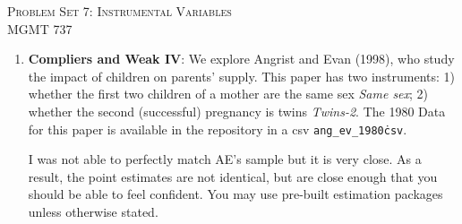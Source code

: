 \documentclass[11pt, a4paper]{article}
\begin{document}
\begin{center}
  {\Large \textsc{Problem Set 7: Instrumental Variables}}\\
  MGMT 737
\end{center}

\begin{enumerate}
\item \textbf{Compliers and Weak IV}: We explore Angrist and Evan (1998), who
  study the impact of children on parents' supply. This paper has two
  instruments: 1) whether the first two children of a mother are the
  same sex \textit{Same sex}; 2) whether the second (successful)
  pregnancy is twins \textit{Twins-2}. The 1980 Data for this paper is
  available in the repository in a csv \texttt{ang\_ev\_1980\.csv}.

  I was not able to perfectly match AE's sample but it is very
  close. As a result, the point estimates are not identical, but are
  close enough that you should be able to feel confident. You may use pre-built estimation packages unless otherwise stated.


\end{enumerate}
\end{document}
